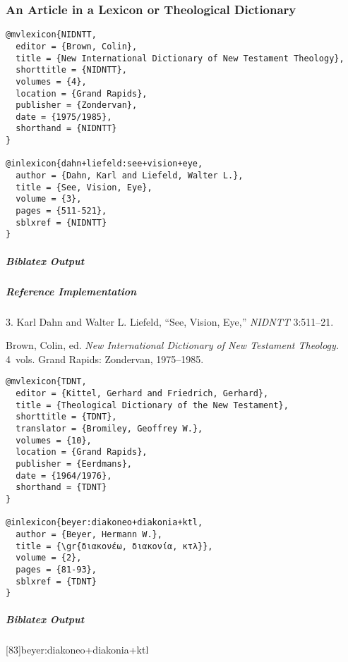 \documentclass[a4paper]{article}
\newcommand{\gr}[1]{{\greekfont #1}}
\newenvironment{biboutput}{%
  \subparagraph{Biblatex Output}
}{\color{black}}
\newenvironment{refimp}{%
  \subparagraph{Reference Implementation}
  \color{reference-colour}
  \rm
}{\par\color{black}}
\begin{document}
\subsubsection{An Article in a Lexicon or Theological Dictionary}

\begin{lstlisting}
@mvlexicon{NIDNTT,
  editor = {Brown, Colin},
  title = {New International Dictionary of New Testament Theology},
  shorttitle = {NIDNTT},
  volumes = {4},
  location = {Grand Rapids},
  publisher = {Zondervan},
  date = {1975/1985},
  shorthand = {NIDNTT}
}

@inlexicon{dahn+liefeld:see+vision+eye,
  author = {Dahn, Karl and Liefeld, Walter L.},
  title = {See, Vision, Eye},
  volume = {3},
  pages = {511-521},
  sblxref = {NIDNTT}
}
\end{lstlisting}

\begin{biboutput}
\end{biboutput}

\begin{refimp}
  3. Karl Dahn and Walter L. Liefeld, “See, Vision, Eye,” \emph{NIDNTT} 3:511–21.

  \hangindent\bibindent Brown, Colin, ed. \emph{New International Dictionary
  of New Testament Theology.} 4~vols. Grand Rapids: Zondervan, 1975–1985.

\end{refimp}

\medskip

\begin{lstlisting}
@mvlexicon{TDNT,
  editor = {Kittel, Gerhard and Friedrich, Gerhard},
  title = {Theological Dictionary of the New Testament},
  shorttitle = {TDNT},
  translator = {Bromiley, Geoffrey W.},
  volumes = {10},
  location = {Grand Rapids},
  publisher = {Eerdmans},
  date = {1964/1976},
  shorthand = {TDNT}
}

@inlexicon{beyer:diakoneo+diakonia+ktl,
  author = {Beyer, Hermann W.},
  title = {\gr{διακονέω, διακονία, κτλ}},
  volume = {2},
  pages = {81-93},
  sblxref = {TDNT}
}
\end{lstlisting}
  
\begin{biboutput}
  [83]{beyer:diakoneo+diakonia+ktl}
\end{biboutput}
\end{document}
